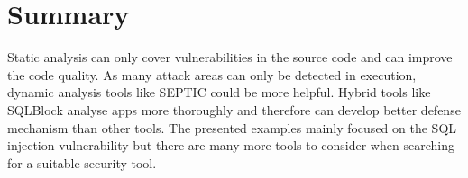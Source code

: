 \section{Summary}
Static analysis can only cover vulnerabilities in the source code and can improve the code quality. As many attack areas can only be detected in execution, dynamic analysis tools like SEPTIC could be more helpful. Hybrid tools like SQLBlock analyse apps more thoroughly and therefore can develop better defense mechanism than other tools. The presented examples mainly focused on the SQL injection vulnerability but there are many more tools to consider when searching for a suitable security tool.






